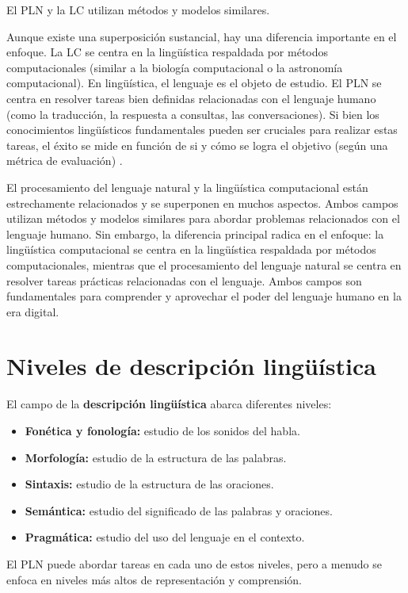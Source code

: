 \documentclass{book}
\begin{document}
El PLN y la LC utilizan métodos y modelos similares.


Aunque existe una superposición sustancial, hay una diferencia importante en el enfoque. La LC se centra en la lingüística respaldada por métodos computacionales (similar a la biología computacional o la astronomía computacional). En lingüística, el lenguaje es el objeto de estudio. El PLN se centra en resolver tareas bien definidas relacionadas con el lenguaje humano (como la traducción, la respuesta a consultas, las conversaciones). Si bien los conocimientos lingüísticos fundamentales pueden ser cruciales para realizar estas tareas, el éxito se mide en función de si y cómo se logra el objetivo (según una métrica de evaluación) \cite{jacobbook}.



El procesamiento del lenguaje natural y la lingüística computacional están estrechamente relacionados y se superponen en muchos aspectos. Ambos campos utilizan métodos y modelos similares para abordar problemas relacionados con el lenguaje humano. Sin embargo, la diferencia principal radica en el enfoque: la lingüística computacional se centra en la lingüística respaldada por métodos computacionales, mientras que el procesamiento del lenguaje natural se centra en resolver tareas prácticas relacionadas con el lenguaje. Ambos campos son fundamentales para comprender y aprovechar el poder del lenguaje humano en la era digital.


\section{Niveles de descripción lingüística}

El campo de la \textbf{descripción lingüística} abarca diferentes niveles:

\begin{itemize}
  \item \textbf{Fonética y fonología:} estudio de los sonidos del habla.
  \item \textbf{Morfología:} estudio de la estructura de las palabras.
  \item \textbf{Sintaxis:} estudio de la estructura de las oraciones.
  \item \textbf{Semántica:} estudio del significado de las palabras y oraciones.
  \item \textbf{Pragmática:} estudio del uso del lenguaje en el contexto.
\end{itemize}

El PLN puede abordar tareas en cada uno de estos niveles, pero a menudo se enfoca en niveles más altos de representación y comprensión.
\end{document}
